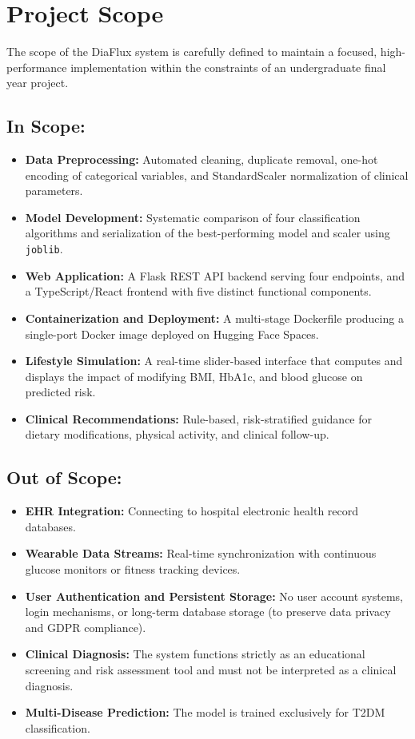 \documentclass[12pt,a4paper]{report}
\begin{document}
\section{Project Scope}
The scope of the DiaFlux system is carefully defined to maintain a focused, high-performance implementation within the constraints of an undergraduate final year project.

\subsection*{In Scope:}
\begin{itemize}
    \item \textbf{Data Preprocessing:} Automated cleaning, duplicate removal, one-hot encoding of categorical variables, and StandardScaler normalization of clinical parameters.
    \item \textbf{Model Development:} Systematic comparison of four classification algorithms and serialization of the best-performing model and scaler using \texttt{joblib}.
    \item \textbf{Web Application:} A Flask REST API backend serving four endpoints, and a TypeScript/React frontend with five distinct functional components.
    \item \textbf{Containerization and Deployment:} A multi-stage Dockerfile producing a single-port Docker image deployed on Hugging Face Spaces.
    \item \textbf{Lifestyle Simulation:} A real-time slider-based interface that computes and displays the impact of modifying BMI, HbA1c, and blood glucose on predicted risk.
    \item \textbf{Clinical Recommendations:} Rule-based, risk-stratified guidance for dietary modifications, physical activity, and clinical follow-up.
\end{itemize}

\subsection*{Out of Scope:}
\begin{itemize}
    \item \textbf{EHR Integration:} Connecting to hospital electronic health record databases.
    \item \textbf{Wearable Data Streams:} Real-time synchronization with continuous glucose monitors or fitness tracking devices.
    \item \textbf{User Authentication and Persistent Storage:} No user account systems, login mechanisms, or long-term database storage (to preserve data privacy and GDPR compliance).
    \item \textbf{Clinical Diagnosis:} The system functions strictly as an educational screening and risk assessment tool and must not be interpreted as a clinical diagnosis.
    \item \textbf{Multi-Disease Prediction:} The model is trained exclusively for T2DM classification.
\end{itemize}
\end{document}
